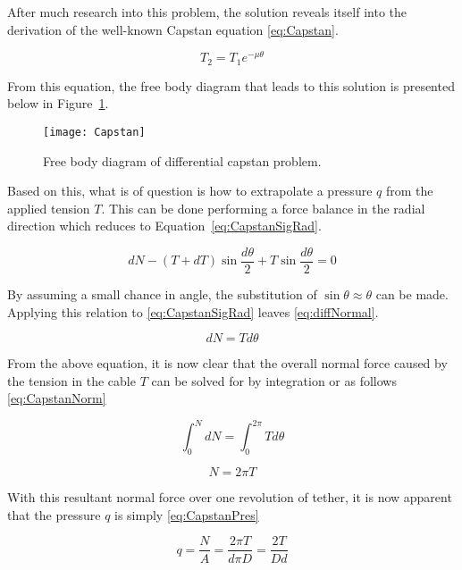 After much research into this problem, the solution reveals itself into the derivation of the well-known Capstan equation \ref{eq:Capstan}.

\begin{equation}
	\label{eq:Capstan}
	T_2 = T_1 e^{-\mu\theta}
\end{equation}


From this equation, the free body diagram that leads to this solution is presented below in Figure~\ref{fig:Capstan}. 

\begin{figure}[!htbp]
	\centering
	\texttt{[image: Capstan]}
	\caption{Free body diagram of differential capstan problem.}
	\label{fig:Capstan}
\end{figure}

Based on this, what is of question is how to extrapolate a pressure $q$ from the applied tension $T$. This can be done performing a force balance in the radial direction which reduces to Equation~\ref{eq:CapstanSigRad}.

\begin{equation}
	\label{eq:CapstanSigRad}
	dN-(T+dT)\sin \frac{d\theta}{2}+T\sin \frac{d\theta}{2}= 0
\end{equation}

By assuming a small chance in angle, the substitution of $\sin \theta \approx \theta$ can be made. Applying this relation to \ref{eq:CapstanSigRad} leaves \ref{eq:diffNormal}.

\begin{equation}
	\label{eq:diffNormal}
	dN = T d\theta
\end{equation}

From the above equation, it is now clear that the overall normal force caused by the tension in the cable $T$ can be solved for by integration or as follows \ref{eq:CapstanNorm}

\begin{equation}
	\int_0^N dN =\int_0^{2\pi} T d\theta
\end{equation}

\begin{equation}
	\label{eq:CapstanNorm}
	N=2\pi T	
\end{equation}

With this resultant normal force over one revolution of tether, it is now apparent that the pressure $q$ is simply \ref{eq:CapstanPres}

\begin{equation}
	\label{eq:CapstanPres}
	q=\frac{N}{A}=\frac{2\pi T}{d\pi D}=\frac{2T}{Dd}
\end{equation}

